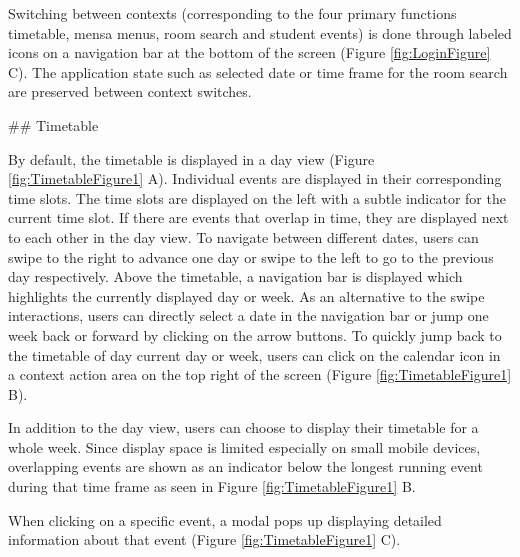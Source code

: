 \begin{markdown}
Switching between contexts (corresponding to the four primary functions timetable, mensa menus, room search and student events) is done through labeled icons on a navigation bar at the bottom of the screen (Figure \ref{fig:LoginFigure} C). The application state such as selected date or time frame for the room search are preserved between context switches.

\newpage

## Timetable

By default, the timetable is displayed in a day view (Figure \ref{fig:TimetableFigure1} A). Individual events are displayed in their corresponding time slots. The time slots are displayed on the left with a subtle indicator for the current time slot. If there are events that overlap in time, they are displayed next to each other in the day view. To navigate between different dates, users can swipe to the right to advance one day or swipe to the left to go to the previous day respectively. Above the timetable, a navigation bar is displayed which highlights the currently displayed day or week. As an alternative to the swipe interactions, users can directly select a date in the navigation bar or jump one week back or forward by clicking on the arrow buttons. To quickly jump back to the timetable of day current day or week, users can click on the calendar icon in a context action area on the top right of the screen (Figure \ref{fig:TimetableFigure1} B).

In addition to the day view, users can choose to display their timetable for a whole week. Since display space is limited especially on small mobile devices, overlapping events are shown as an indicator below the longest running event during that time frame as seen in Figure \ref{fig:TimetableFigure1} B.

When clicking on a specific event, a modal pops up displaying detailed information about that event (Figure \ref{fig:TimetableFigure1} C).

\bigskip


\end{markdown}
